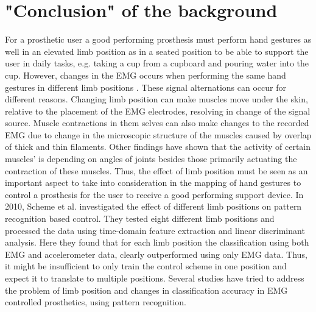 \section{"Conclusion" of the background}

For a prosthetic user a good performing prosthesis must perform hand gestures as well in an elevated limb position as in a seated position to be able to support the user in daily tasks, e.g. taking a cup from a cupboard and pouring water into the cup. However, changes in the EMG occurs when performing the same hand gestures in different limb positions \cite{Fougner2011, avella2006}. These signal alternations can occur for different reasons. Changing limb position can make muscles move under the skin, relative to the placement of the EMG electrodes, resolving in change of the signal source. Muscle contractions in them selves can also make changes to the recorded EMG due to change in the microscopic structure of the muscles caused by overlap of thick and thin filaments. \cite{martini}  
Other findings have shown that the activity of certain muscles' is depending on angles of joints besides those primarily actuating the contraction of these muscles. \cite{Fougner2011} Thus, the effect of limb position must be seen as an important aspect to take into consideration in the mapping of hand gestures to control a prosthesis for the user to receive a good performing support device. %
In 2010, Scheme et al. investigated the effect of different limb positions on pattern recognition based control. They tested eight different limb positions and processed the data using time-domain feature extraction and linear discriminant analysis. Here they found that for each limb position the classification using both EMG and accelerometer data, clearly outperformed using only EMG data. Thus, it might be insufficient to only train the control scheme in one position and expect it to translate to multiple positions. \cite{Fougner2010} 
Several studies have tried to address the problem of limb position and changes in classification accuracy in EMG controlled prosthetics, using pattern recognition. %

